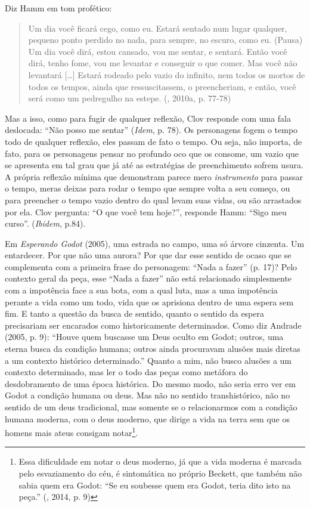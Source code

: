 Diz Hamm em tom profético:

\begin{quote}
Um dia você ficará cego, como eu. Estará sentado num lugar qualquer,
pequeno ponto perdido no nada, para sempre, no escuro, como eu. (Pausa)
Um dia você dirá, estou cansado, vou me sentar, e sentará. Então você
dirá, tenho fome, vou me levantar e conseguir o que comer. Mas você não
levantará [\ldots{}] Estará rodeado pelo vazio do infinito, nem
todos os mortos de todos os tempos, ainda que ressuscitassem, o
preencheriam, e então, você será como um pedregulho na estepe. (,
2010a, p. 77-78)
\end{quote}

Mas a isso, como para fugir de qualquer reflexão, Clov responde com uma
fala deslocada: ``Não posso me sentar'' (\emph{Idem}, p. 78). Os
personagens fogem o tempo todo de qualquer reflexão, eles passam de fato
o tempo. Ou seja, não importa, de fato, para os personagens pensar no
profundo oco que os consome, um vazio que se apresenta em tal grau que
já até as estratégias de preenchimento sofrem usura. A própria reflexão
mínima que demonstram parece mero \emph{instrumento} para passar o
tempo, meras deixas para rodar o tempo que sempre volta a seu começo, ou
para preencher o tempo vazio dentro do qual levam suas vidas, ou são
arrastados por ela. Clov pergunta: ``O que você tem hoje?'', responde
Hamm: ``Sigo meu curso''. (\emph{Ibidem}, p.84).

Em \emph{Esperando Godot} (2005), uma estrada no campo, uma só árvore
cinzenta. Um entardecer. Por que não uma aurora? Por que dar esse
sentido de ocaso que se complementa com a primeira frase do personagem:
``Nada a fazer'' (p. 17)? Pelo contexto geral da peça, esse ``Nada a
fazer'' não está relacionado simplesmente com a impotência face a sua
bota, com a qual luta, mas a uma impotência perante a vida como um todo,
vida que os aprisiona dentro de uma espera sem fim. E tanto a questão da
busca de sentido, quanto o sentido da espera precisariam ser encarados
como historicamente determinados. Como diz Andrade (2005, p. 9): ``Houve
quem buscasse um Deus oculto em Godot; outros, uma eterna busca da
condição humana; outros ainda procuravam alusões mais diretas a um
contexto histórico determinado.'' Quanto a mim, não busco alusões a
um contexto determinado, mas ler o todo das peças como metáfora do
desdobramento de uma época histórica. Do mesmo modo, não seria erro ver
em Godot a condição humana ou deus. Mas não no sentido transhistórico,
não no sentido de um deus tradicional, mas somente se o relacionarmos
com a condição humana moderna, com o deus moderno, que dirige a vida na
terra sem que os homens mais ateus consigam notar\footnote{Essa
  dificuldade em notar o deus moderno, já que a vida moderna é marcada
  pelo esvaziamento do céu, é sintomática no próprio Beckett, que também
  não sabia quem era Godot: ``Se eu soubesse quem era Godot, teria dito
  isto na peça.'' (, 2014, p. 9)}.

